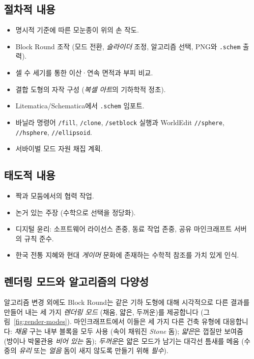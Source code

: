 \documentclass[12pt,a4paper]{scrartcl}
\newcommand{\cmd}[1]{\textcolor{earth}{\texttt{\small #1}}}
\begin{document}
\subsection{절차적 내용}
\begin{itemize}[leftmargin=1.3em,itemsep=0.15em,topsep=0.3em]
  \item 명시적 기준에 따른 모눈종이 위의 손 작도.
  \item Block Round 조작 (모드 전환, \emph{슬라이더} 조정, 알고리즘 선택, PNG와 \texttt{.schem} 출력).
  \item 셀 수 세기를 통한 이산·연속 면적과 부피 비교.
  \item 결합 도형의 자작 구성 (\emph{복셀 아트}의 기하학적 정초).
  \item Litematica/Schematica에서 \texttt{.schem} 임포트.
  \item 바닐라 명령어 \cmd{/fill}, \cmd{/clone}, \cmd{/setblock} 실행과 WorldEdit \cmd{//sphere}, \cmd{//hsphere}, \cmd{//ellipsoid}.
  \item 서바이벌 모드 자원 채집 계획.
\end{itemize}

\subsection{태도적 내용}
\begin{itemize}[leftmargin=1.3em,itemsep=0.15em,topsep=0.3em]
  \item 짝과 모둠에서의 협력 작업.
  \item 논거 있는 주장 (수학으로 선택을 정당화).
  \item 디지털 윤리: 소프트웨어 라이선스 존중, 동료 작업 존중, 공유 마인크래프트 서버의 규칙 준수.
  \item 한국 전통 지혜와 현대 \emph{게이머} 문화에 존재하는 수학적 참조를 가치 있게 인식.
\end{itemize}

\subsection{렌더링 모드와 알고리즘의 다양성}

알고리즘 변경 외에도 Block Round는 같은 기하 도형에 대해 시각적으로 다른 결과를 만들어 내는 세 가지 \emph{렌더링 모드} (채움, 얇은, 두꺼운)를 제공합니다 (그림~\ref{fig:render-modes}). 마인크래프트에서 이들은 세 가지 다른 건축 유형에 대응합니다: \emph{채움} 구는 내부 블록을 모두 사용 (속이 채워진 \emph{Stone} 돔); \emph{얇은}은 껍질만 보여줌 (방이나 박물관용 \emph{비어 있는} 돔); \emph{두꺼운}은 얇은 모드가 남기는 대각선 틈새를 메움 (수중의 \emph{유리} 또는 \emph{얼음} 돔이 새지 않도록 만들기 위해 \emph{필수}).
\end{document}
